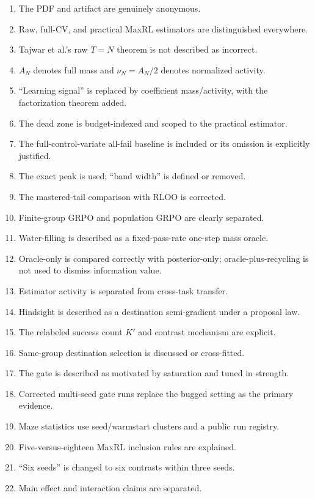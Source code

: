 \documentclass[11pt]{article}
\theoremstyle{definition}
\theoremstyle{remark}
\begin{document}
\begin{enumerate}[leftmargin=2em,label=$\square$]
\item The PDF and artifact are genuinely anonymous.
\item Raw, full-CV, and practical MaxRL estimators are distinguished everywhere.
\item Tajwar et al.'s raw $T=N$ theorem is not described as incorrect.
\item $A_N$ denotes full mass and $\nu_N=A_N/2$ denotes normalized activity.
\item ``Learning signal'' is replaced by coefficient mass/activity, with the factorization theorem added.
\item The dead zone is budget-indexed and scoped to the practical estimator.
\item The full-control-variate all-fail baseline is included or its omission is explicitly justified.
\item The exact peak is used; ``band width'' is defined or removed.
\item The mastered-tail comparison with RLOO is corrected.
\item Finite-group GRPO and population GRPO are clearly separated.
\item Water-filling is described as a fixed-pass-rate one-step mass oracle.
\item Oracle-only is compared correctly with posterior-only; oracle-plus-recycling is not used to dismiss information value.
\item Estimator activity is separated from cross-task transfer.
\item Hindsight is described as a destination semi-gradient under a proposal law.
\item The relabeled success count $K'$ and contrast mechanism are explicit.
\item Same-group destination selection is discussed or cross-fitted.
\item The gate is described as motivated by saturation and tuned in strength.
\item Corrected multi-seed gate runs replace the bugged setting as the primary evidence.
\item Maze statistics use seed/warmstart clusters and a public run registry.
\item Five-versus-eighteen MaxRL inclusion rules are explained.
\item ``Six seeds'' is changed to six contrasts within three seeds.
\item Main effect and interaction claims are separated.

\end{enumerate}
\end{document}
